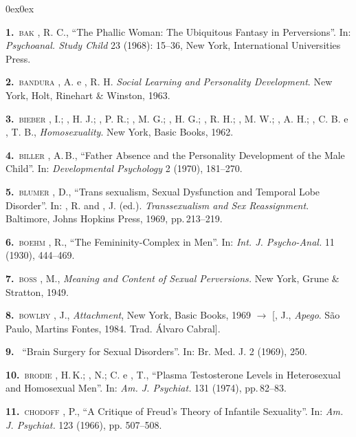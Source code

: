 \begin{bibliohedra}0ex\parsep0ex\footnotesize{}
\renewcommand{\tit}[2]{\item[\textbf{#1}~\textnormal{\textsc{\MakeTextLowercase{#2}}}]}
\renewcommand{\titidem}[1]{\item[\textbf{#1}~\line(1,0){25}]}

\tit{1.}{Bak}, R. C., ``The Phallic Woman: The Ubiquitous Fantasy in
Perversions''. In: \textit{Psychoanal. Study Child} 23 (1968):
15--36, New York, International Universities Press.

\tit{2.}{Bandura}, A. e , R. H. \textit{Social Learning and Personality
Development}. New York, Holt, Rinehart \& Winston, 1963.

\tit{3.}{Bieber}, I.; , H. J.; , P. R.; , M. 
G.; , H. G.; ,
R. H.; , M. W.; , A. H.; , C. B. e , T. B.,
\textit{Homosexuality}. New York, Basic Books, 1962.

\tit{4.}{Biller}, A.\,B., ``Father Absence and the Personality Development of
the Male Child''. In: \textit{Developmental Psychology} 2 (1970),
181--270.

\tit{5.}{Blumer}, D., ``Trans sexualism, Sexual Dysfunction and Temporal
Lobe Disorder''. In: , R. and , J. (ed.). 
\textit{Transsexualism and Sex Reassignment}. 
Baltimore, Johns Hopkins Press, 1969, pp.\,213--219.

\tit{6.}{Boehm}, R., ``The Femininity-Complex in Men''. In:
\textit{Int. J. Psycho-Anal. }11 (1930), 444--469.

\tit{7.}{Boss}, M., \textit{Meaning and Content of Sexual Perversions. }New York, Grune \&
Stratton, 1949.

\tit{8.}{Bowlby}, J., \textit{Attachment}, New York, Basic Books, 1969 {$\bm{\rightarrow}$} [, J.,
\textit{Apego}. São Paulo, Martins Fontes, 1984. Trad. Álvaro Cabral].

\tit{9.}{} ``Brain Surgery for Sexual Disorders''. In: Br. Med. J. 2
(1969), 250.

\tit{10.}{Brodie}, H.\,K.; , N.;  C. e , T., ``Plasma
Testosterone Levels in Heterosexual and Homosexual Men''. In: \textit{Am.
J. Psychiat.} 131 (1974), pp.\,82--83.

\tit{11.}{Chodoff}, P., ``A Critique of Freud's Theory of
Infantile Sexuality''. In: \textit{Am. J. Psychiat. }123 (1966), pp.
507--508.


\end{bibliohedra}
